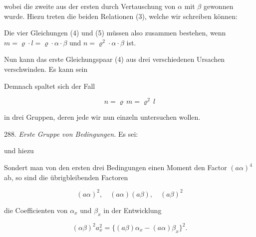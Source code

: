 wobei die zweite aus der ersten durch Vertauschung von $\alpha$ mit $\beta$ gewonnen wurde. Hiezu treten die beiden Relationen (3), welche wir schreiben können:



Die vier Gleichungen (4) und (5) müssen also zusammen bestehen, wenn $m = \varrho \cdot l = \varrho \cdot \alpha \cdot \beta$ und $n = \varrho^2 \cdot \alpha \cdot \beta$ ist.

Nun kann das erste Gleichungspaar (4) aus drei verschiedenen Ursachen verschwinden. Es kann sein




Demnach spaltet sich der Fall

\[ n = \varrho\, m = \varrho^2\, l \]

in drei Gruppen, deren jede wir nun einzeln untersuchen wollen.

288. \textit{Erste Gruppe von Bedingungen.} Es sei:



und hiezu



Sondert man von den ersten drei Bedingungen einen Moment den Factor $(a\alpha)^4$ ab, so sind die übrigbleibenden Factoren

\[ (a\alpha)^2,\quad (a\alpha)(a\beta),\quad (a\beta)^2 \]

die Coefficienten von $\alpha_x$ und $\beta_x$ in der Entwicklung

\[ (\alpha\beta)^2 a_x^2 = \{(a\beta)\alpha_x - (a\alpha)\beta_x\}^2. \]

